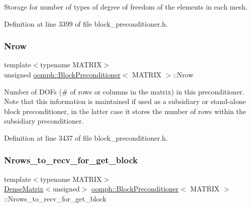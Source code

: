 Storage for number of types of degree of freedom of the elements in each mesh. 



Definition at line 3399 of file block\+\_\+preconditioner.\+h.

\mbox{\label{classoomph_1_1BlockPreconditioner_a4aa232afd2a76adac97fb7d484a18c5e}} 
\subsubsection{\texorpdfstring{Nrow}{Nrow}}
{\footnotesize\ttfamily template$<$typename M\+A\+T\+R\+IX$>$ \\
unsigned \hyperlink{classoomph_1_1BlockPreconditioner}{oomph\+::\+Block\+Preconditioner}$<$ M\+A\+T\+R\+IX $>$\+::Nrow\hspace{0.3cm}{\ttfamily [private]}}



Number of D\+O\+Fs (\# of rows or columns in the matrix) in this preconditioner. Note that this information is maintained if used as a subsidiary or stand-\/alone block preconditioner, in the latter case it stores the number of rows within the subsidiary preconditioner. 



Definition at line 3437 of file block\+\_\+preconditioner.\+h.

\mbox{\label{classoomph_1_1BlockPreconditioner_a9ab1a931e617f04a50e8f24e75069628}} 
\subsubsection{\texorpdfstring{Nrows\+\_\+to\+\_\+recv\+\_\+for\+\_\+get\+\_\+block}{Nrows\_to\_recv\_for\_get\_block}}
{\footnotesize\ttfamily template$<$typename M\+A\+T\+R\+IX$>$ \\
\hyperlink{classoomph_1_1DenseMatrix}{Dense\+Matrix}$<$unsigned$>$ \hyperlink{classoomph_1_1BlockPreconditioner}{oomph\+::\+Block\+Preconditioner}$<$ M\+A\+T\+R\+IX $>$\+::Nrows\+\_\+to\+\_\+recv\+\_\+for\+\_\+get\+\_\+block\hspace{0.3cm}{\ttfamily [private]}}




